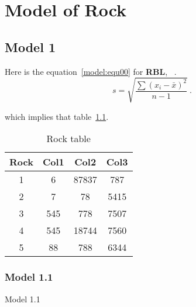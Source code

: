 %
%
\chapter{Model of Rock}

\section{Model 1}

Here is the equation~\ref{model:equ00} for {\bf RBL}, {\ie} {\rbl}~\cite{Smith2010}. 
\begin{equation}
 s = \sqrt{\frac{ \sum (x_{i} - \bar{x})^2}{n - 1}}  \label{model:equ00} ~ .  
\end{equation}

which implies that table~\ref{model:table00}.

\begin{table}[h!]
\centering
 \begin{tabular}{||c c c c||} 
 \hline
 Rock & Col1 & Col2 & Col3 \\ [0.5ex] 
 \hline\hline
 1 & 6 & 87837 & 787 \\ 
 2 & 7 & 78 & 5415 \\
 3 & 545 & 778 & 7507 \\
 4 & 545 & 18744 & 7560 \\
 5 & 88 & 788 & 6344 \\ [1ex] 
 \hline
 \end{tabular}
\caption{Rock table}
\label{model:table00}
\end{table}

\subsection{Model 1.1}

Model 1.1
